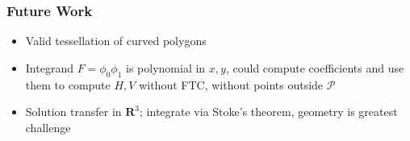 \documentclass{beamer}
\begin{document}
\begin{frame}
\frametitle{Future Work}
\begin{itemize}
\pause
\item Valid tessellation of curved polygons
\pause
\item Integrand \(F = \phi_0 \phi_1\) is polynomial in \(x, y\), could
  compute coefficients and use them to compute \(H, V\) without
  FTC, without points outside \(\mathcal{P}\)
\pause
\item Solution transfer in \(\mathbf{R}^3\); integrate via Stoke's theorem,
  geometry is greatest challenge
\end{itemize}
\end{frame}
\end{document}
